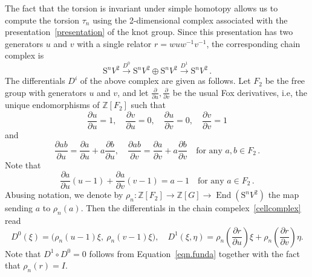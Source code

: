 \documentclass{amsart}
\newcommand{\Z}{\mathbb{Z}}
\renewcommand{\S}{\mathrm{S}}
\DeclareMathOperator{\End}{End}
\theoremstyle{definition}
\begin{document}
The fact that the torsion is invariant under simple homotopy allows us to compute the torsion $\tau_n$ using the 2-dimensional complex associated with the presentation~\eqref{presentation} of the knot group. Since this presentation has two generators $u$ and $v$ with a single relator $r=wuw^{-1}v^{-1}$, the corresponding chain complex is
\begin{equation}\label{cellcomplex}
    \S^nV^2 \overset{D^0}{\longrightarrow} \S^nV^2 \oplus \S^nV^2 \overset{D^1}{\longrightarrow} \S^nV^2 \, .
\end{equation}
The differentials $D^i$ of the above complex are given as follows.
Let $F_2$ be the free group with generators $u$ and $v$, and let $\frac{\partial}{\partial u},\frac{\partial}{\partial v}$ be the usual Fox derivatives, i.e, the unique endomorphisms of $\Z[F_2]$ such that
$$\frac{\partial u}{\partial u}=1,\quad \frac{\partial v}{\partial u}=0,\quad \frac{\partial u}{\partial v}=0,\quad \frac{\partial v}{\partial v}=1$$
and
$$\frac{\partial ab}{\partial u}=\frac{\partial a}{\partial u}+a\frac{\partial b}{\partial u},\quad
\frac{\partial ab}{\partial v}=\frac{\partial a}{\partial v}+a\frac{\partial b}{\partial v} \quad \text{for any } a,b\in F_2 \,.$$
Note that 
\begin{equation}
\label{eqn.funda}
     \frac{\partial a}{\partial u}(u-1)+\frac{\partial{a}}{\partial v}(v-1)=a-1 \quad \text{for any } a \in F_2 \,.
\end{equation}
Abusing notation, we denote by $\rho_n:\Z[F_2]\to \Z[G]\to \End(\S^n V^2)$ the map sending $a$ to $\rho_n(a)$. Then the differentials in the chain compelex~\eqref{cellcomplex} read
$$ D^0(\xi)=\Big(\rho_n(u-1)\xi,\ \rho_n(v-1)\xi \Big),\quad D^1(\xi,\eta)=\rho_n\! \left(\frac{\partial r}{\partial u}\right)\xi+\rho_n\! \left(\frac{\partial r}{\partial v}\right)\eta. $$
Note that $D^1\circ D^0=0$ follows from Equation~\eqref{eqn.funda} together with the fact that $\rho_n(r)=I$.
\end{document}
